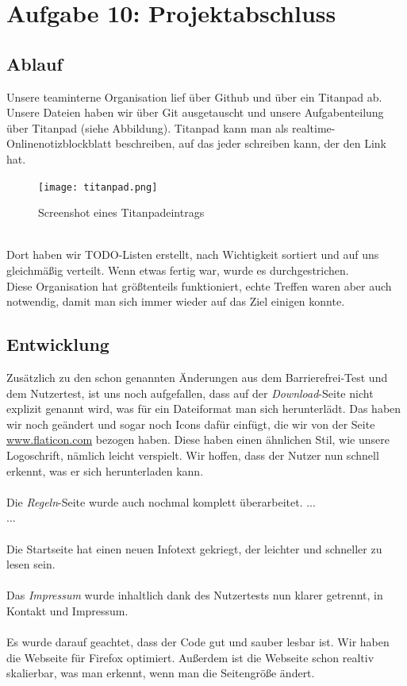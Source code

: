 \documentclass{scrartcl}
\begin{document}
\section*{Aufgabe 10: Projektabschluss}

\subsection*{Ablauf}
Unsere teaminterne Organisation lief über Github und über ein Titanpad ab. Unsere Dateien haben wir über Git ausgetauscht und unsere Aufgabenteilung über Titanpad (siehe Abbildung). Titanpad kann man als realtime-Onlinenotizblockblatt beschreiben, auf das jeder schreiben kann, der den Link hat.
\begin{figure}[H]
 \centering
   \texttt{[image: titanpad.png]}
\caption{Screenshot eines Titanpadeintrags}
\end{figure}\ \\
Dort haben wir TODO-Listen erstellt, nach Wichtigkeit sortiert und auf uns gleichmäßig verteilt. Wenn etwas fertig war, wurde es durchgestrichen. \\
Diese Organisation hat größtenteils funktioniert, echte Treffen waren aber auch notwendig, damit man sich immer wieder auf das Ziel einigen konnte.

\subsection*{Entwicklung}
Zusätzlich zu den schon genannten Änderungen aus dem Barrierefrei-Test und dem Nutzertest, ist uns noch aufgefallen, dass auf der \textit{Download}-Seite nicht explizit genannt wird, was für ein Dateiformat man sich herunterlädt. Das haben wir noch geändert und sogar noch Icons dafür einfügt, die wir von der Seite \url{www.flaticon.com} bezogen haben. Diese haben einen ähnlichen Stil, wie unsere Logoschrift, nämlich leicht verspielt. Wir hoffen, dass der Nutzer nun schnell erkennt, was er sich herunterladen kann.\\
\\
Die \textit{Regeln}-Seite wurde auch nochmal komplett überarbeitet.
... \\
...\\ \\
Die Startseite hat einen neuen Infotext gekriegt, der leichter und schneller zu lesen sein.\\ \\
Das \textit{Impressum} wurde inhaltlich dank des Nutzertests nun klarer getrennt, in Kontakt und Impressum. \\ \\
Es wurde darauf geachtet, dass der Code gut und sauber lesbar ist. Wir haben die Webseite für Firefox optimiert. Außerdem ist die Webseite schon realtiv skalierbar, was man erkennt, wenn man die Seitengröße ändert.
\end{document}
